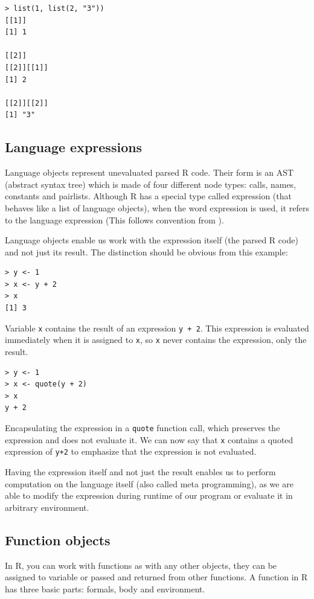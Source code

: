 \documentclass[thesis=B,english]{FITthesis}[2012/10/20]
\begin{document}
\begin{verbatim}
> list(1, list(2, "3"))
[[1]]
[1] 1

[[2]]
[[2]][[1]]
[1] 2

[[2]][[2]]
[1] "3"
\end{verbatim}

\subsection{Language expressions}
Language objects represent unevaluated parsed R code. Their form is an AST (abstract syntax tree) which is made of four different node types: calls, names, constants and pairlists. Although R has a special type called expression (that behaves like a list of language objects), when the word expression is used, it refers to the language expression (This follows convention from \cite{advR}).

Language objects enable us work with the expression itself (the parsed R code) and not just its result. The distinction should be obvious from this example:

\begin{verbatim}
> y <- 1
> x <- y + 2
> x
[1] 3
\end{verbatim}

Variable \verb|x| contains the result of an expression \verb|y + 2|. This expression is evaluated immediately when it is assigned to \verb|x|, so \verb|x| never contains the expression, only the result.

\begin{verbatim}
> y <- 1
> x <- quote(y + 2)
> x
y + 2
\end{verbatim}

Encapsulating the expression in a \verb|quote| function call, which preserves the expression and does not evaluate it. We can now say that \verb|x| contains a quoted expression of \verb|y+2| to emphasize that the expression is not evaluated. 

Having the expression itself and not just the result enables us to perform computation on the language itself (also called meta programming), as we are able to modify the expression during runtime of our program or evaluate it in arbitrary environment.

\subsection{Function objects}
In R, you can work with functions as with any other objects, they can be assigned to variable or passed and returned from other functions. A function in R has three basic parts: formals, body and environment. 
\end{document}
